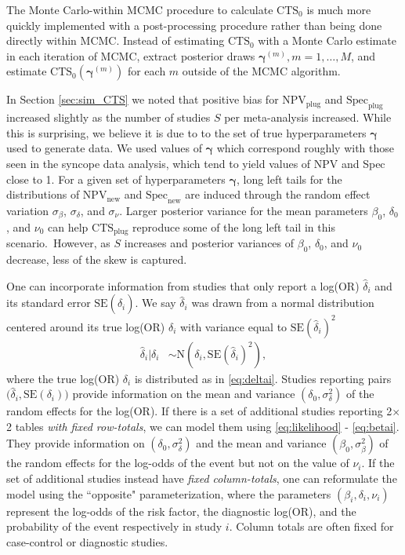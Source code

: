 \documentclass[AMA,STIX1COL]{WileyNJD-v2}
\newcommand{\boldgamma}{\boldsymbol{\gamma}}
\newcommand{\CTSo}{\text{CTS}_0}
\newcommand{\CTSp}{\text{CTS}_{\text{plug}}}
\begin{document}
The Monte Carlo-within MCMC procedure to calculate $\CTSo$ is much more quickly implemented with a post-processing procedure rather than being done directly within MCMC. Instead of estimating $\CTSo$ with a Monte Carlo estimate in each iteration of MCMC, extract posterior draws $\boldgamma^{(m)}, m = 1, \dots, M$, and estimate $\CTSo(\boldgamma^{(m)})$ for each $m$ outside of the MCMC algorithm. 

In Section \ref{sec:sim_CTS} we noted that positive bias for $\text{NPV}_{\text{plug}}$ and $\text{Spec}_{\text{plug}}$ increased slightly as the number of studies $S$ per meta-analysis increased. While this is surprising, we believe it is due to to the set of true hyperparameters $\boldgamma$ used to generate data. We used values of $\boldgamma$ which correspond roughly with those seen in the syncope data analysis, which tend to yield values of NPV and Spec close to 1. For a given set of hyperparameters $\boldgamma$, long left tails for the distributions of $\text{NPV}_{\text{new}}$ and $\text{Spec}_{\text{new}}$ are induced through the random effect variation $\sigma_{\beta}$, $\sigma_{\delta}$, and $\sigma_{\nu}$. Larger posterior variance for the mean parameters $\beta_0$, $\delta_0$, and $\nu_0$ can help $\CTSp$ reproduce some of the long left tail in this scenario. However, as $S$ increases and posterior variances of $\beta_0$, $\delta_0$, and $\nu_0$ decrease, less of the skew is captured. 

One can incorporate information from studies that only report a log(OR) $\widehat{\delta}_i$ and its standard error $\text{SE}(\widehat{\delta}_i)$. We say $\widehat{\delta}_i$ was drawn from a normal distribution centered around its true log(OR) $\delta_i$ with variance equal to $\text{SE}(\widehat{\delta}_i)^2$
\begin{align}
\widehat{\delta}_i \vert \delta_i &\sim \mbox{N}(\delta_i, \mbox{SE}(\widehat{\delta}_i)^2), \label{eq:deltahat} 
\end{align}
where the true log(OR) $\delta_i$ is distributed as in \eqref{eq:deltai}. Studies reporting pairs $\big(\widehat{\delta}_i, \mbox{SE}(\delta_i) \big)$ provide information on the mean and variance $(\delta_0, \sigma^2_\delta)$ of the random effects for the log(OR). If there is a set of additional studies reporting 2$\times$2 tables \textit{with fixed row-totals}, we can model them using \eqref{eq:likelihood} - \eqref{eq:betai}. They provide information on $(\delta_0, \sigma^2_\delta)$ and the mean and variance $(\beta_0, \sigma^2_\beta)$ of the random effects for the log-odds of the event but not on the value of $\nu_i$. If the set of additional studies instead have \textit{fixed column-totals}, one can reformulate the model using the ``opposite" parameterization, where the parameters $(\beta_i, \delta_i, \nu_i)$ represent the log-odds of the risk factor, the diagnostic log(OR), and the probability of the event respectively in study $i$. Column totals are often fixed for case-control or diagnostic studies. 
\end{document}
